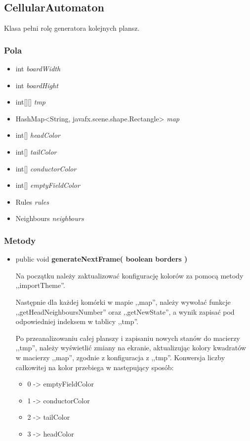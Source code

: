 \documentclass[a4paper,11pt]{article}
\begin{document}
\subsection{CellularAutomaton}
Klasa pełni rolę generatora kolejnych plansz.

\subsubsection{Pola}
\begin{itemize}
\item int  \textit{boardWidth}
\item int  \textit{boardHight}
\item int[][] \textit{tmp}
\item HashMap<String, javafx.scene.shape.Rectangle> \textit{map}
\item int[]  \textit{headColor}
\item int[]  \textit{tailColor}
\item int[]  \textit{conductorColor}
\item int[]  \textit{emptyFieldColor}
\item Rules \textit{rules}
\item Neighbours \textit{neighbours}

\end{itemize}

\subsubsection{Metody}
\begin{itemize}
\item public void  \textbf{generateNextFrame( boolean borders )}

Na początku należy zaktualizować konfigurację kolorów za pomocą metody ,,importTheme''.

Następnie dla każdej komórki w mapie ,,map'', należy wywołać funkcje ,,getHeadNeighboursNumber'' oraz ,,getNewState'', a wynik zapisać pod odpowiedniej indeksem w tablicy ,,tmp''.

Po przeanalizowaniu całej planszy i zapisaniu nowych stanów do macierzy ,,tmp'', należy wyświetlić zmiany na ekranie, aktualizując kolory kwadratów w macierzy ,,map'', zgodnie z konfiguracja z ,,tmp''. Konwersja liczby całkowitej na kolor przebiega w następujący sposób:
\begin{itemize}
\item 0 -> emptyFieldColor
\item 1 -> conductorColor
\item 2 -> tailColor
\item 3 -> headColor
\end{itemize}

\end{itemize}
\end{document}
